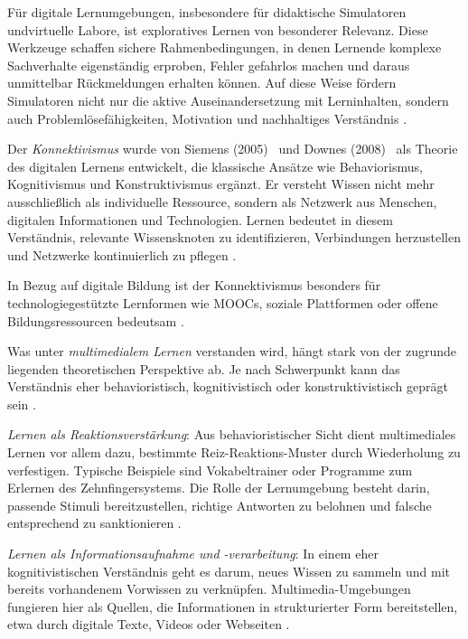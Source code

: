 Für digitale Lernumgebungen, insbesondere für didaktische Simulatoren undvirtuelle Labore, ist exploratives Lernen von besonderer Relevanz. Diese Werkzeuge schaffen sichere Rahmenbedingungen, in denen Lernende komplexe Sachverhalte eigenständig erproben, Fehler gefahrlos machen und daraus unmittelbar Rückmeldungen erhalten können. Auf diese Weise fördern Simulatoren nicht nur die aktive Auseinandersetzung mit Lerninhalten, sondern auch Problemlösefähigkeiten, Motivation und nachhaltiges Verständnis \parencite[S.~131]{engelhardt-nowitzki_einsatz_2006}.

Der \textit{Konnektivismus} wurde von Siemens (2005)~\cite{siemens_connectivism_2005} und Downes (2008)~\cite{downes_introduction_2008} als Theorie des digitalen Lernens entwickelt, die klassische Ansätze wie Behaviorismus, Kognitivismus und Konstruktivismus ergänzt. Er versteht Wissen nicht mehr ausschließlich als individuelle Ressource, sondern als Netzwerk aus Menschen, digitalen Informationen und Technologien. Lernen bedeutet in diesem Verständnis, relevante Wissensknoten zu identifizieren, Verbindungen herzustellen und Netzwerke kontinuierlich zu pflegen \parencite[S.~14]{abbas_theory_2015}.

In Bezug auf digitale Bildung ist der Konnektivismus besonders für technologiegestützte Lernformen wie MOOCs, soziale Plattformen oder offene Bildungsressourcen bedeutsam \parencite[S.~14]{abbas_theory_2015}.

Was unter \textit{multimedialem Lernen} verstanden wird, hängt stark von der zugrunde liegenden theoretischen Perspektive ab. Je nach Schwerpunkt kann das Verständnis eher behavioristisch, kognitivistisch oder konstruktivistisch geprägt sein \parencite[S.~64]{furstenau_lehr-lern-theorien_2019}. 

\textit{Lernen als Reaktionsverstärkung}: Aus behavioristischer Sicht dient multimediales Lernen vor allem dazu, bestimmte Reiz-Reaktions-Muster durch Wiederholung zu verfestigen. Typische Beispiele sind Vokabeltrainer oder Programme zum Erlernen des Zehnfingersystems. Die Rolle der Lernumgebung besteht darin, passende Stimuli bereitzustellen, richtige Antworten zu belohnen und falsche entsprechend zu sanktionieren \parencite[S.~64]{furstenau_lehr-lern-theorien_2019}. 

\textit{Lernen als Informationsaufnahme und -verarbeitung}: In einem eher kognitivistischen Verständnis geht es darum, neues Wissen zu sammeln und mit bereits vorhandenem Vorwissen zu verknüpfen. Multimedia-Umgebungen fungieren hier als Quellen, die Informationen in strukturierter Form bereitstellen, etwa durch digitale Texte, Videos oder Webseiten \parencite[S.~64]{furstenau_lehr-lern-theorien_2019}. 

